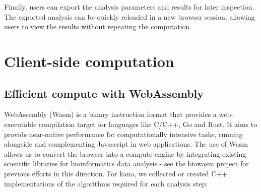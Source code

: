 \documentclass{article}
\begin{document}
Finally, users can export the analysis parameters and results for later inspection.
The exported analysis can be quickly reloaded in a new browser session, allowing users to view the results without repeating the computation.

\section{Client-side computation}

\subsection{Efficient compute with WebAssembly}

WebAssembly (Wasm) \cite{haas2017bringing} is a binary instruction format that provides a web-executable compilation target for languages like C/C++, Go and Rust.
It aims to provide near-native performance for computationally intensive tasks, running alongside and complementing Javascript in web applications.
The use of Wasm allows us to convert the browser into a compute engine by integrating existing scientific libraries for bioinformatics data analysis -
see the biowasm project \cite{biowasm} for previous efforts in this direction.
For kana, we collected or created C++ implementations of the algorithms required for each analysis step:
\end{document}

